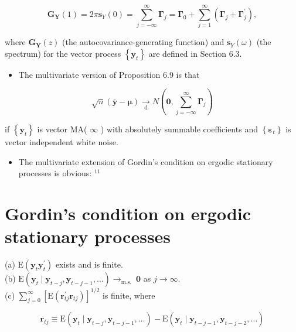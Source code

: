 \documentclass[10pt]{article}
\begin{document}
\begin{equation*}
\mathbf{G}_{\mathbf{Y}}(1)=2 \pi \mathbf{s}_{Y}(0)=\sum_{j=-\infty}^{\infty} \boldsymbol{\Gamma}_{j}=\boldsymbol{\Gamma}_{0}+\sum_{j=1}^{\infty}\left(\boldsymbol{\Gamma}_{j}+\boldsymbol{\Gamma}_{j}^{\prime}\right), \tag{6.5.6}
\end{equation*}


where $\mathbf{G}_{\mathbf{Y}}(z)$ (the autocovariance-generating function) and $\mathbf{s}_{Y}(\omega)$ (the spectrum) for the vector process $\left\{\mathbf{y}_{t}\right\}$ are defined in Section 6.3.

\begin{itemize}
  \item The multivariate version of Proposition 6.9 is that
\end{itemize}


\begin{equation*}
\sqrt{n}(\overline{\mathbf{y}}-\boldsymbol{\mu}) \underset{\mathrm{d}}{\rightarrow} N\left(\mathbf{0}, \sum_{j=-\infty}^{\infty} \boldsymbol{\Gamma}_{j}\right) \tag{6.5.7}
\end{equation*}


if $\left\{\mathbf{y}_{t}\right\}$ is vector MA( $\infty$ ) with absolutely summable coefficients and $\left\{\boldsymbol{\varepsilon}_{t}\right\}$ is vector independent white noise.

\begin{itemize}
  \item The multivariate extension of Gordin's condition on ergodic stationary processes is obvious: ${ }^{11}$
\end{itemize}

\section*{Gordin's condition on ergodic stationary processes}
(a) $\mathrm{E}\left(\mathbf{y}_{t} \mathbf{y}_{t}^{\prime}\right)$ exists and is finite.\\
(b) $\mathrm{E}\left(\mathbf{y}_{t} \mid \mathbf{y}_{t-j}, \mathbf{y}_{t-j-1}, \ldots\right) \rightarrow_{\text {m.s. }} \mathbf{0}$ as $j \rightarrow \infty$.\\
(c) $\sum_{j=0}^{\infty}\left[\mathrm{E}\left(\mathbf{r}_{t j}^{\prime} \mathbf{r}_{t j}\right)\right]^{1 / 2}$ is finite, where

$$
\mathbf{r}_{t j} \equiv \mathrm{E}\left(\mathbf{y}_{t} \mid \mathbf{y}_{t-j}, \mathbf{y}_{t-j-1}, \ldots\right)-\mathrm{E}\left(\mathbf{y}_{t} \mid \mathbf{y}_{t-j-1}, \mathbf{y}_{t-j-2}, \ldots\right)
$$
\end{document}
